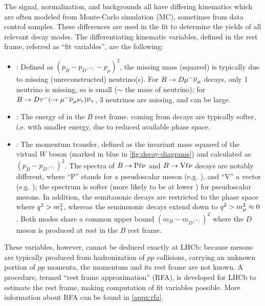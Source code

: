 The signal, normalization, and backgrounds all have differing kinematics
which are often modeled from Monte-Carlo simulation (MC),
sometimes from data control samples.
These differences are used in the fit to determine the yields of all
relevant decay modes.
The differentiating kinematic variables, defined in the \B rest frame,
referred as ``fit variables'',
are the following:
\begin{itemize}
    \item \mmSq: Defined as $(p_B - p_{D^{(*)}} - p_\mu)^2$,
        the missing mass (squared) is typically due to missing (unreconstructed)
        neutrino(s).
        For $B \rightarrow D {\mu^-} {{\overline{\nu}}_\mu}$ decays, only 1 neutrino is missing,
        so \mmSq is small ($\sim$ the mass of neutrino);
        for $B \rightarrow D {\tau^-} (\rightarrow {\ensuremath{\mu^-}}{\ensuremath{{\overline{\nu}}_\mu}}{\ensuremath{{\nu}_\tau}}) {{\overline{\nu}}_\tau}$,
        3 neutrinos are missing, and \mmSq can be large.
    \item \el: The energy of \mun in the $B$ rest frame.
        \mun coming from \taum decays are typically
        softer, i.e. with smaller energy, due to reduced available phase space.
    \item \qSq: The momentum transfer, defined as the invariant mass squared
        of the virtual $W$ boson (marked in blue in \cref{fig:decay-diagrams})
        and calculated as $(p_B - p_{D^{(*)}})^2$.
        The \qSq spectra of
        $B \rightarrow \text{P} \ell{\ensuremath{\nu}}$ and $B \rightarrow \text{V} \ell{\ensuremath{\nu}}$
        decays are notably different,
        where ``P'' stands for a pseudoscalar meson (e.g. \Dz),
        and ``V'' a vector (e.g. \Dstar);
        the \qSq spectrum is softer
        (more likely to be at lower \qSq) for pseudoscalar mesons.
        In addition, the semitauonic decays are restricted to the phase space
        where $q^2 > m^2_\tau$,
        whereas the semimuonic decays extend down to $q^2 > m^2_\mu \approx 0$.
        Both modes share a common \qSq upper bound $(m_B - m_{D^{(*)}})^2$
        where the $D$ meson is produced at rest in the $B$ rest frame.
\end{itemize}
These variables, however, cannot be deduced exactly at LHCb:
because \B mesons
are typically produced from hadronization of $pp$ collisions,
carrying an unknown portion of $pp$ momenta,
the \B momentum and its rest frame are not known.
A procedure, termed ``rest frame approximation'' (RFA), is developed for LHCb
to estimate the \B rest frame, making computation of fit variables possible.
More information about RFA can be found in \cref{appx:rfa}.

